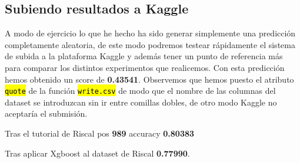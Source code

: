 \documentclass[10pt,a4paper]{article}
\newcommand{\code}[1]{\sethlcolor{rblue}\hl{\texttt{#1}}} %
\begin{document}
\subsection{Subiendo resultados a Kaggle}

A modo de ejercicio lo que he hecho ha sido generar simplemente una predicción completamente aleatoria, de este modo podremos testear rápidamente el sistema de subida a la plataforma Kaggle y además tener un punto de referencia más para comparar los distintos experimentos que realicemos. Con esta predicción hemos obtenido un score de \textbf{0.43541}. Observemos que hemos puesto el atributo \code{quote} de la función \code{write.csv} de modo que el nombre de las columnas del dataset se introduzcan sin ir entre comillas dobles, de otro modo Kaggle no aceptaría el submisión.

Tras el tutorial de Riscal pos \textbf{989} accuracy \textbf{0.80383}

Tras aplicar Xgboost al dataset de Riscal \textbf{0.77990}.
\end{document}
